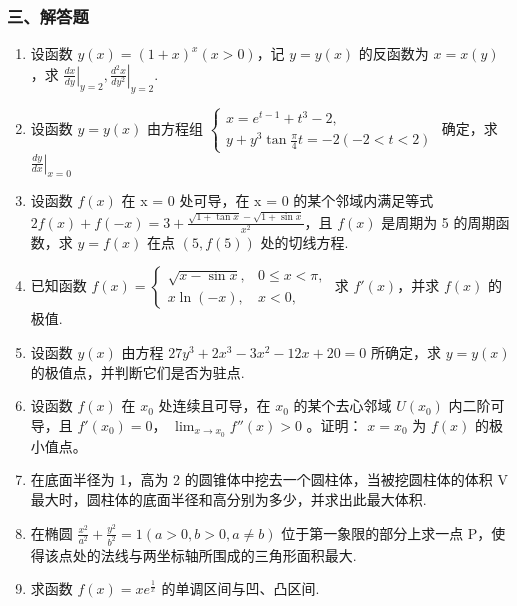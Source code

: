 \documentclass[12pt, a4paper]{ctexart}
\begin{document}
\subsubsection*{三、解答题}

\begin{enumerate}[start=65]
    \item 设函数 $ y(x)=(1+x)^{x}(x>0) $，记 $ y=y(x) $ 的反函数为 $ x=x(y) $，求 $ \left.\frac{dx}{dy}\right|_{y=2},\left.\frac{d^{2}x}{dy^{2}}\right|_{y=2} $.

    \item 设函数 $ y = y(x) $ 由方程组 $ \begin{cases} x = e^{t-1} + t^{3} - 2, \\ y + y^{3} \tan \frac{\pi}{4} t = -2(-2 < t < 2) \end{cases} $ 确定，求 $ \left.\frac{dy}{dx}\right|_{x=0} $

    \item 设函数 $ f(x) $ 在 x = 0 处可导，在 x = 0 的某个邻域内满足等式 $ 2f(x) + f(-x) = 3 + \frac{\sqrt{1 + \tan x} - \sqrt{1 + \sin x}}{x^2} $，且 $ f(x) $ 是周期为 5 的周期函数，求 $ y = f(x) $ 在点 $ (5, f(5)) $ 处的切线方程.

    \item 已知函数 $ f(x)=\begin{cases}\sqrt{x-\sin x}, & 0\leq x<\pi, \\ x\ln(-x), & x<0,\end{cases} $ 求 $ f'(x) $，并求 $ f(x) $ 的极值.

    \item 设函数 $ y(x) $ 由方程 $ 27y^{3} + 2x^{3} - 3x^{2} - 12x + 20 = 0 $ 所确定，求 $ y = y(x) $ 的极值点，并判断它们是否为驻点.

    \item 设函数 $ f(x) $ 在 $ x_0 $ 处连续且可导，在 $ x_0 $ 的某个去心邻域 $ \hat{U}(x_0) $ 内二阶可导，且 $ f'(x_0) = 0 $， $ \lim_{x \to x_0} f''(x) > 0 $ 。证明： $ x = x_0 $ 为 $ f(x) $ 的极小值点。

    \item 在底面半径为 1，高为 2 的圆锥体中挖去一个圆柱体，当被挖圆柱体的体积 V 最大时，圆柱体的底面半径和高分别为多少，并求出此最大体积.

    \item 在椭圆 $ \frac{x^{2}}{a^{2}}+\frac{y^{2}}{b^{2}}=1(a>0,b>0,a\neq b) $ 位于第一象限的部分上求一点 P，使得该点处的法线与两坐标轴所围成的三角形面积最大.

    \item 求函数 $ f(x)=xe^{\frac{1}{x}} $ 的单调区间与凹、凸区间.


\end{enumerate}
\end{document}
